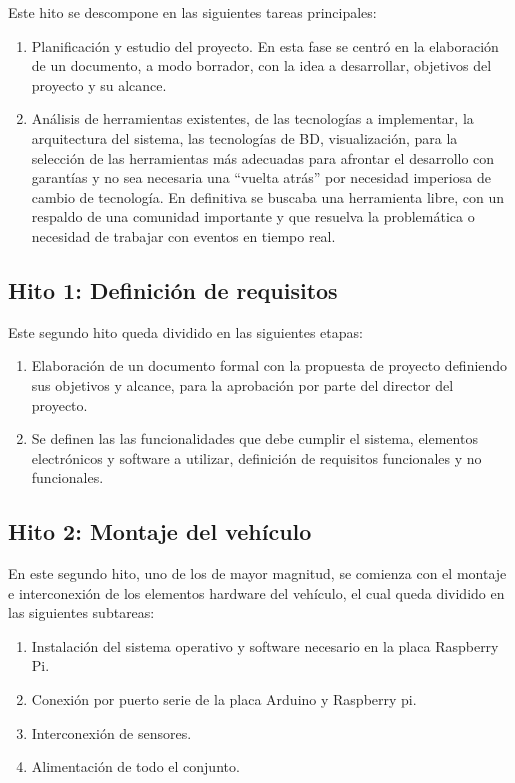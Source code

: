 Este hito se descompone en las siguientes tareas principales:

\begin{enumerate}
 \item Planificación y estudio del proyecto. En esta fase se centró en la elaboración de un documento, a modo borrador, con la idea a desarrollar, objetivos del proyecto y su alcance.
 \item Análisis de herramientas existentes, de las tecnologías a implementar, la arquitectura del sistema, las tecnologías de BD, visualización, para la selección de las herramientas más adecuadas 
 para afrontar el desarrollo con garantías y no sea necesaria una ``vuelta atrás'' por necesidad imperiosa de cambio de tecnología. En definitiva se buscaba una herramienta libre, con un respaldo de una comunidad importante
 y que resuelva la problemática o necesidad de trabajar con eventos en tiempo real.
\end{enumerate}

\subsection{Hito 1: Definición de requisitos }
\label{subsec:hito2}

Este segundo hito queda dividido en las siguientes etapas:

\begin{enumerate}
 \item Elaboración de un documento formal con la propuesta de proyecto definiendo sus objetivos y alcance, para la aprobación por parte del director del proyecto.
 \item Se definen las las funcionalidades que debe cumplir el sistema, elementos electrónicos y software a utilizar, definición de requisitos funcionales y no funcionales. 
\end{enumerate}

\subsection{Hito 2: Montaje del vehículo}
\label{subsec:hito2}

En este segundo hito, uno de los de mayor magnitud, se comienza con el montaje e interconexión de los elementos hardware del vehículo, el cual queda dividido en las siguientes subtareas:\\

\begin{enumerate}
 \item Instalación del sistema operativo y software necesario en la placa Raspberry Pi.
 \item Conexión por puerto serie de la placa Arduino y Raspberry pi.
 \item Interconexión de sensores.
 \item Alimentación de todo el conjunto.
\end{enumerate}


